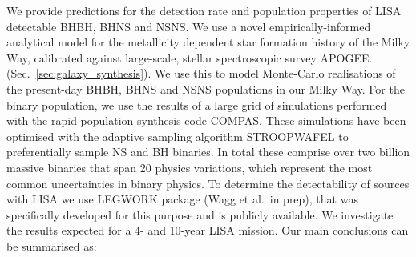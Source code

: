 We provide predictions for the detection rate and population properties of LISA detectable BHBH, BHNS and NSNS.
%
We use a novel empirically-informed analytical model for the metallicity dependent star formation history of the Milky Way, calibrated against large-scale, stellar spectroscopic survey APOGEE. (Sec.~\ref{sec:galaxy_synthesis}). We use this to model Monte-Carlo realisations of the present-day BHBH, BHNS and NSNS populations in our Milky Way. 
%
For the binary population, we use the results of a large grid of simulations performed with the rapid population synthesis code COMPAS. These simulations have been optimised with the adaptive sampling algorithm STROOPWAFEL to preferentially sample NS and BH binaries. In total these comprise over two billion massive binaries that span 20 physics variations, which represent the most common uncertainties in binary physics.
%
To determine the detectability of sources with LISA we use LEGWORK package (Wagg et al.\ in prep), that was specifically developed for this purpose and is publicly available. 
%
We investigate the results expected for a 4- and 10-year LISA mission. Our main conclusions can be summarised as:
